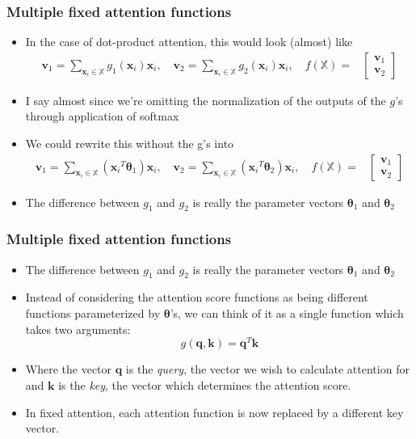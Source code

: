 \documentclass{beamer}
\renewcommand{\vec}[1]{{\boldsymbol{#1}}}
\newcommand{\svec}[2]{{\vec{#1}_{#2}}}
\begin{document}
\begin{frame}
  \frametitle{Multiple fixed attention functions}
  \begin{itemize}
  \item In the case of dot-product attention, this would look (almost) like
    \begin{align*}
      \svec{v}{1} = \sum_{\svec{x}{i} \in \mathbb{X}} g_1(\svec{x}{i}) \svec{x}{i},
      \quad \svec{v}{2}=\sum_{\svec{x}{i} \in \mathbb{X}} g_2(\svec{x}{i}) \svec{x}{i},
      \quad f(\mathbb{X}) =& \begin{bmatrix} \svec{v}{1} \\ \svec{v}{2} \end{bmatrix}
    \end{align*}

  \item I say almost since we're omitting the normalization of the outputs of the  $g$'s through application of softmax

  \item We could rewrite this without the g's into
    \begin{align*}
      \svec{v}{1} = \sum_{\svec{x}{i} \in \mathbb{X}} (\svec{x}{i}^T\svec{\theta}{1}) \svec{x}{i},
      \quad \svec{v}{2}=\sum_{\svec{x}{i} \in \mathbb{X}} (\svec{x}{i}^T\svec{\theta}{2}) \svec{x}{i},
      \quad f(\mathbb{X}) =& \begin{bmatrix} \svec{v}{1} \\ \svec{v}{2} \end{bmatrix}
    \end{align*}
  \item The difference between $g_1$ and $g_2$ is really the parameter vectors $\svec{\theta}{1}$ and $\svec{\theta}{2}$

  \end{itemize}

\end{frame}
\begin{frame}
  \frametitle{Multiple fixed attention functions}
  \begin{itemize}
    \item The difference between $g_1$ and $g_2$ is really the parameter vectors $\svec{\theta}{1}$ and $\svec{\theta}{2}$

    \item Instead of considering the attention score functions as being different functions parameterized by $\vec{\theta}$'s, we can think of it as a single function which takes two arguments:
      \[ g(\vec{q}, \vec{k}) = \vec{q}^T \vec{k} \]

    \item Where the vector $\vec{q}$ is the \emph{query}, the vector we wish to calculate attention for and $\vec{k}$ is the \emph{key}, the vector which determines the attention score.
    \item In fixed attention, each attention function is now replaced by a different key vector.
  \end{itemize}

\end{frame}
\end{document}
